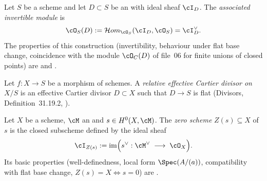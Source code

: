 \begin{definition}
\label{def:pc-divisor-line-bundle}
Let $S$ be a scheme and let $D\subset S$ be an
with ideal sheaf $\cI_D$.  The \emph{associated invertible module} is
\[
\cO_S(D):=\mathcal{H}om_{\cO_S}(\cI_D,\cO_S)=\cI_D^\vee .
\]
The properties of this construction (invertibility, behaviour under flat
base change, coincidence with the module $\cO_C(D)$ of file~06 for
finite unions of closed points) are
 and
.
\end{definition}

\begin{definition}
\label{def:pc-relative-effective-cartier}
Let $f:X\to S$ be a morphism of schemes.  A \emph{relative effective
Cartier divisor on $X/S$} is an effective Cartier divisor $D\subset X$
such that $D\to S$ is flat (Divisors, Definition~31.19.2,
).
\end{definition}

\begin{definition}\label{def:pc-zero-scheme}
Let $X$ be a scheme, $\cM$ an
 and
$s\in H^0(X,\cM)$.  The \emph{zero scheme} $Z(s)\subseteq X$ of $s$ is
the closed subscheme defined by the ideal sheaf
\[
\cI_{Z(s)}:=\operatorname{im}\Bigl(s^\vee:\cM^\vee
\;\longrightarrow\;\cO_X\Bigr).
\]
Its basic properties (well-definedness, local form
$\Spec(A/(a))$, compatibility with flat base change, $Z(s)=X
\Leftrightarrow s=0$) are .
\end{definition}

